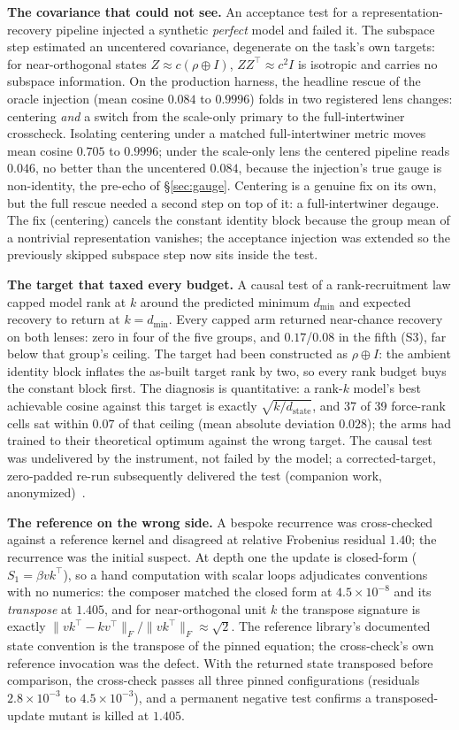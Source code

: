 \documentclass{article}
\newcommand{\dstate}{d_{\mathrm{state}}}
\newcommand{\dmin}{d_{\min}}
\begin{document}
\textbf{The covariance that could not see.} An acceptance test for a
representation-recovery pipeline injected a synthetic \emph{perfect}
model and failed it. The subspace step estimated an uncentered
covariance, degenerate on the task's own targets: for near-orthogonal
states $Z\approx c(\rho\oplus I)$, $ZZ^{\top}\approx c^{2}I$ is
isotropic and carries no subspace information. On the production
harness, the headline rescue of the oracle injection (mean cosine
$0.084$ to $0.9996$) folds in two registered lens changes: centering
\emph{and} a switch from the scale-only primary to the
full-intertwiner crosscheck. Isolating centering under a matched
full-intertwiner metric moves mean cosine $0.705$ to $0.9996$; under
the scale-only lens the centered pipeline reads $0.046$, no better
than the uncentered $0.084$, because the injection's true gauge is
non-identity, the pre-echo of \S\ref{sec:gauge}. Centering is a
genuine fix on its own, but the full rescue needed a second step on
top of it: a full-intertwiner degauge.
The fix (centering) cancels the constant identity block because the
group mean of a nontrivial representation vanishes; the acceptance
injection was extended so the previously skipped subspace step now
sits inside the test.

\textbf{The target that taxed every budget.} A causal test of a
rank-recruitment law capped model rank at $k$ around the predicted
minimum $\dmin$ and expected recovery to return at $k=\dmin$. Every
capped arm returned near-chance recovery on both lenses: zero in four
of the five groups, and $0.17$/$0.08$ in the fifth (S3), far below
that group's ceiling. The target
had been constructed as $\rho\oplus I$: the ambient identity block
inflates the as-built target rank by two, so every rank budget buys
the constant block first. The diagnosis is quantitative: a rank-$k$
model's best achievable cosine against this target is exactly
$\sqrt{k/\dstate}$, and 37 of 39 force-rank cells sat within $0.07$ of
that ceiling (mean absolute deviation $0.028$); the arms had trained
to their theoretical optimum against the wrong target.
The causal test was undelivered by the instrument, not failed by the
model; a corrected-target, zero-padded re-run subsequently delivered
the test (companion work, anonymized)~\citep{companion2026capacity}.

\textbf{The reference on the wrong side.} A bespoke recurrence was
cross-checked against a reference kernel and disagreed at relative
Frobenius residual $1.40$; the recurrence was the initial suspect. At
depth one the update is closed-form ($S_1=\beta vk^{\top}$), so a hand
computation with scalar loops adjudicates conventions with no
numerics: the composer matched the closed form at $4.5\times10^{-8}$
and its \emph{transpose} at $1.405$, and for near-orthogonal unit $k$
the transpose signature is exactly
$\|vk^{\top}-kv^{\top}\|_F/\|vk^{\top}\|_F\approx\sqrt{2}$. The
reference library's documented state convention is the transpose of
the pinned equation; the cross-check's own reference invocation was
the defect. With the returned state transposed before comparison, the
cross-check passes all three pinned configurations (residuals
$2.8\times10^{-3}$ to $4.5\times10^{-3}$), and a permanent negative
test confirms a transposed-update mutant is killed at $1.405$.
\end{document}
